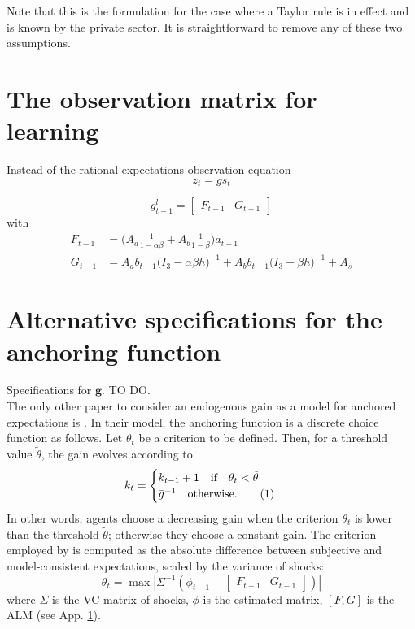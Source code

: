 \documentclass[11pt]{article}
\renewcommand{\[}{\begin{equation}}
\renewcommand{\]}{\end{equation}}
\newcommand\numberthis{\addtocounter{equation}{1}\tag{\theequation}} %
\begin{document}
Note that this is the formulation for the case where a Taylor rule is in effect and is known by the private sector. It is straightforward to remove any of these two assumptions.



\section{The observation matrix for learning}\label{app_FG}
Instead of the rational expectations observation equation
\begin{equation}
z_t = g s_t \label{RE_obs}
\end{equation}

\begin{equation}
g_{t-1}^l = \begin{bmatrix} F_{t-1} & G_{t-1} \end{bmatrix}
\end{equation}
with
\begin{align}
F_{t-1} & = \bigg(A_a \frac{1}{1-\alpha\beta} + A_b\frac{1}{1-\beta} \bigg)a_{t-1}\\
G_{t-1} & = A_a b_{t-1}\bigg(I_3 - \alpha\beta h \bigg)^{-1} + A_b b_{t-1}\bigg(I_3 - \beta h \bigg)^{-1} + A_s
\end{align}

\section{Alternative specifications for the anchoring function}\label{alternative_criteria}
Specifications for $\mathbf{g}$. TO DO. \\
The only other paper to consider an endogenous gain as a model for anchored expectations is \cite{carvalho2019anchored}. In their model, the anchoring function is a discrete choice function as follows. Let $\theta_t$ be a criterion to be defined. Then, for a threshold value $\tilde{\theta}$, the gain evolves according to
\begin{align*}
k_t & = \begin{cases} k_{t-1}+1 \quad \text{if} \quad \theta_t < \tilde{\theta}  \\ \bar{g}^{-1}  \quad \text{otherwise.}\numberthis \label{anchoring_kinked}
\end{cases} 
\end{align*}
In other words, agents choose a decreasing gain when the criterion $\theta_t$ is lower than the threshold $\tilde{\theta}$; otherwise they choose a constant gain. The criterion employed by \cite{carvalho2019anchored} is computed as the absolute difference between subjective and model-consistent expectations, scaled by the variance of shocks:
\begin{equation}
\theta_t = \max | \Sigma^{-1} ( \phi_{t-1} - \begin{bmatrix} F_{t-1} & G_{t-1} \end{bmatrix}) |
\end{equation}
where $\Sigma$ is the VC matrix of shocks, $\phi$ is the estimated matrix, $[F,G]$ is the ALM (see App. \ref{app_FG}).
\end{document}
